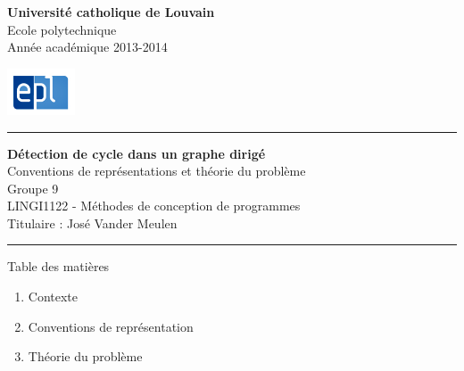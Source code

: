 \begin{minipage}{0.78\linewidth}
\vspace{0.5cm}
\footnotesize\textbf{Université catholique de Louvain}\\
Ecole polytechnique\\
Année académique 2013-2014\\
\end{minipage}
\begin{minipage}{0.1\linewidth}
\begin{flushright}
\includegraphics[width=2cm]{images/logo_EPL.png}
\end{flushright}
\end{minipage}

\vspace{1.5cm}
\par
\hrule height 1.5pt
\par
\vspace{0.5cm}

{\centering
\Large \textbf{Détection de cycle dans un graphe dirigé}\\
\normalsize  Conventions de représentations et théorie du problème\\
\vspace{0.3cm}
\footnotesize Groupe 9\\
LINGI1122 - Méthodes de conception de programmes\\
Titulaire : José Vander Meulen\\}

\vspace{0.5cm}
\par
\hrule height 1.5pt
\par
\vspace{0.5cm}



\begin{frame}{Table des matières}
\begin{enumerate}
  \item Contexte
  \item Conventions de représentation
  \item Théorie du problème
\end{enumerate}
\end{frame}

